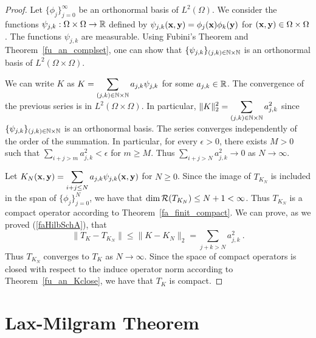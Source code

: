 \begin{proof}
Let $\displaystyle \{\phi_j\}_{j=0}^\infty$ be an orthonormal basis of
$\displaystyle L^2(\Omega)$.  We consider the functions
$\psi_{j,k}:\Omega \times \Omega \to \mathbb{R}$ defined by
$\displaystyle \psi_{j,k}(\mathbf{x},\mathbf{y}) = \phi_j(\mathbf{x})\phi_k(\mathbf{y})$ for
$(\mathbf{x},\mathbf{y}) \in \Omega\times \Omega$.  The functions
$\psi_{j,k}$ are measurable.  Using Fubini's Theorem and
Theorem~\ref{fu_an_complset}, one can show that 
$\displaystyle \{\psi_{j,k}\}_{(j,k)\in \mathbb{N}\times \mathbb{N}}$ is an
orthonormal basis of $\displaystyle L^2(\Omega \times \Omega)$.

We can write $K$ as
$\displaystyle K = \sum_{(j,k)\in \mathbb{N}\times \mathbb{N}} a_{j,k} \psi_{j,k}$
for some $a_{j,k} \in \mathbb{R}$.  The convergence of the previous series is
in $\displaystyle L^2(\Omega\times \Omega)$.  In particular,
$\displaystyle \|K\|_2^2 = \sum_{(j,k)\in \mathbb{N}\times \mathbb{N}} a_{j,k}^2$
since $\displaystyle \{\psi_{j,k}\}_{(j,k)\in \mathbb{N}\times \mathbb{N}}$ is an
orthonormal basis.  The series converges independently of the order
of the summation.  In particular, for every $\epsilon >0$, there
exists $M>0$ such that $\displaystyle \sum_{i+j > m} a_{j,k}^2 < \epsilon$
for $m\geq M$.  Thus $\displaystyle \sum_{i+j > N} a_{j,k}^2 \to 0$ as
$N \to \infty$.

Let $\displaystyle
K_N(\mathbf{x}, \mathbf{y}) = \sum_{i+j\leq N} a_{j,k} \psi_{j,k}(\mathbf{x},\mathbf{y})$
for $N \geq 0$.  Since the image of $T_{K_N}$ is included in the
span of $\displaystyle \{\phi_j\}_{j=0}^N$, we have that
$\dim \mathcal{R}(T_{K_N}) \leq N +1 < \infty$.  Thus
$\displaystyle T_{K_N}$ is a compact
operator according to Theorem~\ref{fa_finit_compact}.  We can prove, as
we proved (\ref{faHilbSchA}), that 
\[
\|T_K - T_{K_N} \| \leq \| K - K_N\|_2 = \sum_{j+k>N} a_{j,k}^2 \ .
\]
Thus $T_{K_N}$ converges to $T_K$ as $N\to \infty$.  Since the space
of compact operators is closed with respect to the induce operator
norm according to Theorem~\ref{fu_an_Kclose},
we have that $T_K$ is compact.
\end{proof}

\section{Lax-Milgram Theorem}

